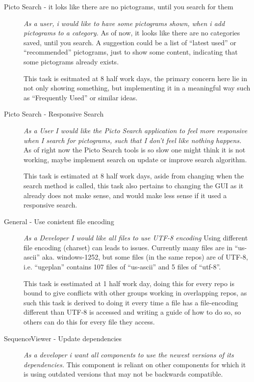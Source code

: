 \begin{description}
    \item[Picto Search - it loks like there are no pictograms, until you search for them]
        \textit{As a user, i would like to have some pictograms shown, when i add pictograms to a category.}
        As of now, it looks like there are no categories saved, until you search.
        A suggestion could be a list of ``latest used'' or ``recommended'' pictograms, just to show some content, indicating that some pictograms already exists.

        This task is esitmated at 8 half work days, the primary concern here lie in not only showing something, but implementing it in a meaningful way such as ``Frequently Used'' or similar ideas.
    \item[Picto Search - Responsive Search]
        \textit{As a User I would like the Picto Search application to feel more responsive when I search for pictograms, such that I don't feel like nothing happens.}
        As of right now the Picto Search tools is so slow one might think it is not working, maybe implement search on update or improve search algorithm.

        This task is estimated at 8 half work days, aside from changing when the search method is called, this task also pertains to changing the GUI as it already does not make sense, and would make less sense if it used a responsive search.
    \item[General - Use conistent file encoding]
        \textit{As a Developer I would like all files to use UTF-8 encoding}
        Using different file encoding (charset) can leads to issues. 
        Currently many files are in ``us-ascii'' aka. windows-1252, but some files (in the same repos) are of UTF-8, i.e. ``ugeplan'' contains 107 files of ``us-ascii'' and 5 files of ``utf-8''. 

        This task is esstimated at 1 half work day, doing this for every repo is bound to give conflicts with other groups working in overlapping repos, as such this task is derived to doing it every time a file has a file-encoding different than UTF-8 is accessed and writing a guide of how to do so, so others can do this for every file they access.
    \item[SequenceViewer - Update dependencies]
        \textit{As a developer i want all components to use the newest versions of its dependencies.}
        This component is reliant on other components for which it is using outdated versions that may not be backwards compatible.


\end{description}
